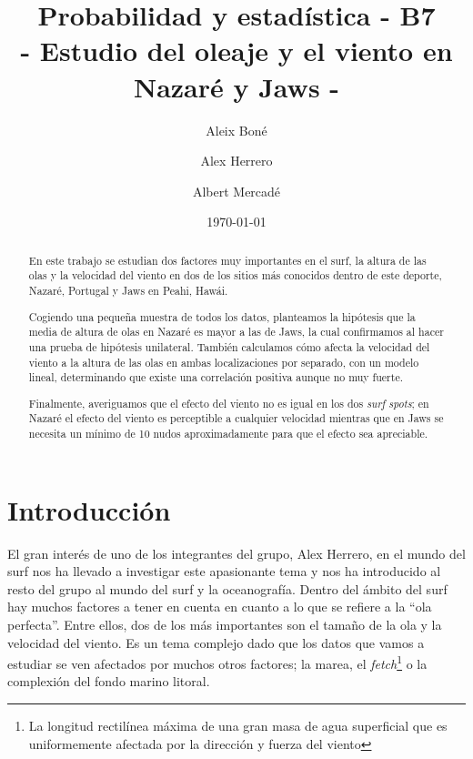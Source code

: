 

\geometry{margin=1in}

\title{
   Probabilidad y estadística - B7 \\
   \large 
   - Estudio del oleaje y el viento en Nazaré y Jaws -
}
\author{
  Aleix Boné \and
  Alex Herrero \and
  Albert Mercadé
}
\date{
  \today
}


\maketitle

\begin{abstract}

En este trabajo se estudian dos factores muy importantes en el surf, la altura de las olas y la velocidad 
del viento en dos de los sitios más conocidos dentro de este deporte, Nazaré, Portugal y Jaws en Peahi, Hawái. 

Cogiendo una pequeña muestra de todos los datos, planteamos la hipótesis que la media de altura de olas
en Nazaré es mayor a las de Jaws, la cual confirmamos al hacer una prueba de hipótesis unilateral.
También calculamos cómo afecta la velocidad del viento a la altura de las olas en ambas localizaciones 
por separado, con un modelo lineal, determinando que existe una correlación positiva aunque no muy fuerte.

Finalmente, averiguamos que el efecto del viento no es igual en los dos \textit{surf spots}; en Nazaré
el efecto del viento es perceptible a cualquier velocidad mientras que en Jaws se necesita un mínimo de 
10 nudos aproximadamente para que el efecto sea apreciable.

\end{abstract}

\section{Introducción}%
\label{sec:introduccion}
El gran interés de uno de los integrantes del grupo, Alex Herrero, en el mundo del surf nos ha llevado a investigar este apasionante tema y nos ha introducido al resto del grupo al mundo del surf y la oceanografía. Dentro del ámbito del surf hay muchos factores a tener en cuenta en cuanto a lo que se refiere a la ``ola perfecta''. Entre ellos, dos de los más importantes son el tamaño de la ola y la velocidad del viento. Es un tema complejo dado que los datos que vamos a estudiar se ven afectados por muchos otros factores; la marea, el \textit{fetch}\footnote{La longitud rectilínea máxima de una gran masa de agua superficial que es uniformemente afectada por la dirección y fuerza del viento} o la complexión del fondo marino litoral.

